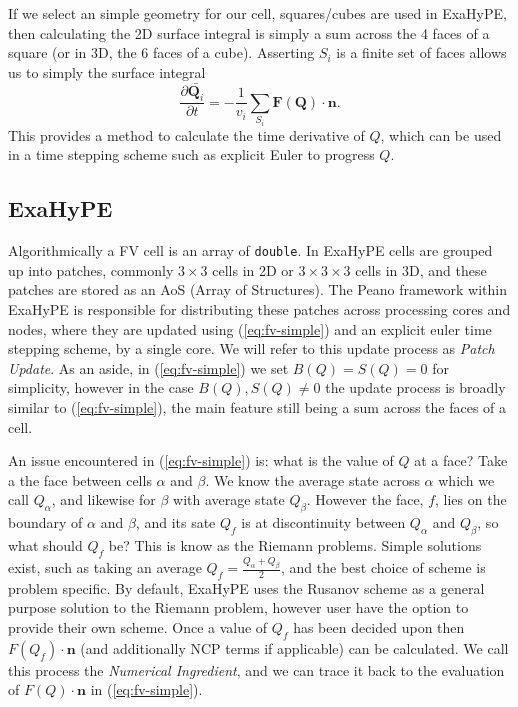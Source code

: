 If we select an simple geometry for our cell, squares/cubes are used in ExaHyPE, then calculating the 2D surface integral is simply a sum across the 4 faces of a square (or in 3D, the 6 faces of a cube).
Asserting $S_i$ is a finite set of faces allows us to simply the surface integral
\begin{equation}\label{eq:fv-simple}
   \frac{\partial \bar{\mathbf{Q}_i}}{\partial t} = -\frac{1}{v_i} \sum_{S_i}\mathbf{F}(\mathbf{Q})\cdot \mathbf{n}.
\end{equation}
This provides a method to calculate the time derivative of $Q$, which can be used in a time stepping scheme such as explicit Euler to progress $Q$.


\subsection{ExaHyPE}
\newcommand{\proc}[1]{\textit{#1}}
Algorithmically a FV cell is an array of \texttt{double}.
In ExaHyPE cells are grouped up into patches, commonly $3\times 3$ cells in 2D or $3\times 3 \times 3$ cells in 3D, and these patches are stored as an AoS (Array of Structures).
The Peano framework within ExaHyPE is responsible for distributing these patches across processing cores and nodes, where they are updated using (\ref{eq:fv-simple}) and an explicit euler time stepping scheme, by a single core.
We will refer to this update process as \proc{Patch Update}.
As an aside, in (\ref{eq:fv-simple}) we set $B(Q)=S(Q)=0$ for simplicity, however in the case $B(Q), S(Q)\neq 0$ the update process is broadly similar to (\ref{eq:fv-simple}), the main feature still being a sum across the faces of a cell.

An issue encountered in (\ref{eq:fv-simple}) is: what is the value of $Q$ at a face?
Take a the face between cells $\alpha$ and $\beta$.
We know the average state across $\alpha$ which we call $Q_\alpha$, and likewise for $\beta$ with average state $Q_\beta$.
However the face, $f$, lies on the boundary of $\alpha$ and $\beta$, and its sate $Q_f$ is at discontinuity between $Q_\alpha$ and $Q_\beta$, so what should $Q_f$ be?
This is know as the Riemann problems.
Simple solutions exist, such as taking an average $Q_f = \frac{Q_\alpha + Q_\beta}{2}$, and the best choice of scheme is problem specific.
By default, ExaHyPE uses the Rusanov scheme \cite{rusanov} as a general purpose solution to the Riemann problem, however user have the option to provide their own scheme.
Once a value of $Q_f$ has been decided upon then $F(Q_f)\cdot \mathbf{n}$ (and additionally NCP terms if applicable) can be calculated.
We call this process the \proc{Numerical Ingredient}, and we can trace it back to the evaluation of $F(Q)\cdot\mathbf{n}$ in (\ref{eq:fv-simple}).

